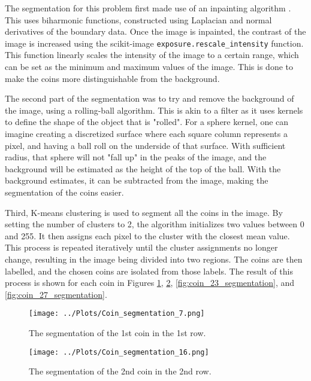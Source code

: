 \documentclass[12pt]{report} %
\begin{document}
The segmentation for this problem first made use of an inpainting algorithm \cite{skimage_inpaint_biharmonic}. This uses biharmonic functions, constructed using Laplacian and normal derivatives of the boundary data\cite{damelin2018surface}. Once the image is inpainted, the contrast of the image is increased using the scikit-image \texttt{exposure.rescale\_intensity} function. This function linearly scales the intensity of the image to a certain range, which can be set as the minimum and maximum values of the image\cite{skimage_rescale_intensity}. This is done to make the coins more distinguishable from the background.

The second part of the segmentation was to try and remove the background of the image, using a rolling-ball algorithm. This is akin to a filter as it uses kernels to define the shape of the object that is "rolled". For a sphere kernel, one can imagine creating a discretized surface where each square column represents a pixel, and having a ball roll on the underside of that surface. With sufficient radius, that sphere will not "fall up" in the peaks of the image, and the background will be estimated as the height of the top of the ball\cite{skimage_rolling_ball}. With the background estimates, it can be subtracted from the image, making the segmentation of the coins easier.

Third, K-means clustering is used to segment all the coins in the image. By setting the number of clusters to 2, the algorithm initializes two values between 0 and 255. It then assigns each pixel to the cluster with the closest mean value. This process is repeated iteratively until the cluster assignments no longer change, resulting in the image being divided into two regions\cite{sklearn_kmeans}. The coins are then labelled, and the chosen coins are isolated from those labels. The result of this process is shown for each coin in Figures \ref{fig:coin_7_segmentation}, \ref{fig:coin_16_segmentation}, \ref{fig:coin_23_segmentation}, and \ref{fig:coin_27_segmentation}.

\begin{figure}[htbp]
    \centering
    \texttt{[image: ../Plots/Coin\_segmentation\_7.png]}
    \caption{The segmentation of the 1st coin in the 1st row.}
    \label{fig:coin_7_segmentation}
\end{figure}

\begin{figure}[htbp]
    \centering
    \texttt{[image: ../Plots/Coin\_segmentation\_16.png]}
    \caption{The segmentation of the 2nd coin in the 2nd row.}
    \label{fig:coin_16_segmentation}
\end{figure}
\end{document}
